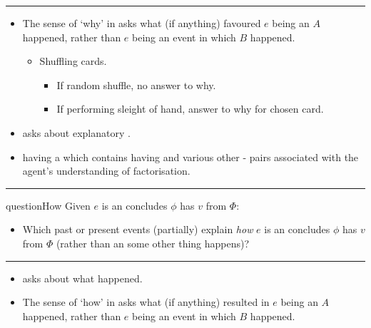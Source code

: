 \documentclass[10pt]{article}
\newcommand\lLine{{\color{lightgray} \noindent\rule{\textwidth}{0.4pt}}}
\newcommand\sepLine{
  \vfill
  \par\noindent\rule{\textwidth}{0.4pt}
  \vfill}
\newcommand{\hand}{\ding{43}}
\begin{document}
\lLine


\begin{note}
  \begin{itemize}
  \item
    The sense of `why' in \qWhy{} asks what (if anything) favoured \(e\) being an \eiw{} \(A\) happened, rather than \(e\) being an event in which \(B\) happened.
    \begin{itemize}
    \item
      Shuffling cards.
      \begin{itemize}
      \item
        If random shuffle, no answer to why.
      \item
        If performing sleight of hand, answer to why for chosen card.
      \end{itemize}
    \end{itemize}
  \end{itemize}

  \begin{itemize}
  \item[\hand]
    \qWhy{} asks about explanatory .
  \item
    \propM{\rootsCon{}} having \val{}  \fof{} a \pool{} which contains \propM{\rootsConEq{}} having \val{}  and various other - pairs associated with the agent's understanding of factorisation.
  \end{itemize}

\end{note}

\sepLine

\begin{note}
  \begin{question}{questionHow}{\qHow{}}
    Given \(e\) is an  \vAgent{} concludes \prop{} \(\phi\) has \val{} \(v\) from \pool{} \(\Phi\):
    \begin{itemize}
    \item
      Which past or present events (partially) explain \emph{how} \(e\) is an  \vAgent{} concludes \prop{} \(\phi\) has \val{} \(v\) from \pool{} \(\Phi\) (rather than an  some other thing happens)?
    \end{itemize}
    \vspace{-1.5\baselineskip}
  \end{question}
\end{note}

\lLine

\begin{note}
  \begin{itemize}
  \item[\hand]
    \qHow{} asks about what happened.
  \end{itemize}

  \begin{itemize}
  \item
    The sense of `how' in \qHow{} asks what (if anything) resulted in \(e\) being an \eiw{} \(A\) happened, rather than \(e\) being an event in which \(B\) happened.
  \end{itemize}
\end{note}
\end{document}
